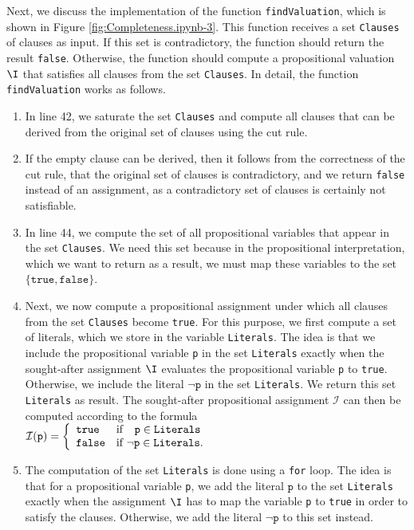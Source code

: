 Next, we discuss the implementation of the function \texttt{findValuation}, which is shown in
Figure \ref{fig:Completeness.ipynb-3}. This function receives a set \texttt{Clauses} of clauses as input.
If this set is contradictory, the function should return the result \texttt{false}.
Otherwise, the function should compute a propositional valuation $\I$ that satisfies all clauses from the set
\texttt{Clauses}. 
In detail, the function \texttt{findValuation} works as follows.
\begin{enumerate}
\item In line 42, we saturate the set \texttt{Clauses} and compute all clauses that can be derived from the
      original set of clauses using the cut rule.
\item If the empty clause can be derived, then it follows from the correctness of the cut rule,
      that the original set of clauses is contradictory, and we return \texttt{false} instead of an assignment,
      as a contradictory set of clauses is certainly not satisfiable.
\item In line 44, we compute the set of all propositional variables that appear in the set
      \texttt{Clauses}. We need this set because in the
      propositional interpretation, which we want to return as a result, we must
      map these variables to the set $\{ \texttt{true}, \texttt{false} \}$.
\item Next, we now compute a propositional assignment under which all clauses from
      the set \texttt{Clauses} become \texttt{true}. For this purpose, we first compute a set of
      literals, which we store in the variable \texttt{Literals}. The idea is that we
      include the propositional variable \texttt{p} in the set \texttt{Literals} exactly when
      the sought-after assignment $\I$ evaluates the propositional
      variable \texttt{p} to \texttt{true}. Otherwise, we include the
      literal $\neg \texttt{p}$ in the set \texttt{Literals}.  We return this set \texttt{Literals} as result.
      The sought-after propositional assignment
      $\mathcal{I}$ can then be computed according to the formula  
      \\[0.2cm]
      \hspace*{1.3cm}
      $\mathcal{I}(\texttt{p}) = \left\{
             \begin{array}{ll}
               \texttt{true}  & \mbox{if $\hspace*{0.25cm}\texttt{p} \in \texttt{Literals}$} \\
               \texttt{false} & \mbox{if $\neg\texttt{p} \in \texttt{Literals}$.}
             \end{array}\right.
            $
\item The computation of the set \texttt{Literals} is done using a \texttt{for} loop.
      The idea is that for a propositional variable \texttt{p}, we add the literal
      $\texttt{p}$ to the set \texttt{Literals} exactly when the assignment $\I$ has to map the variable \texttt{p}
      to \texttt{true} in order to satisfy the clauses. Otherwise, we add
      the literal $\neg\texttt{p}$ to this set instead.


\end{enumerate}
